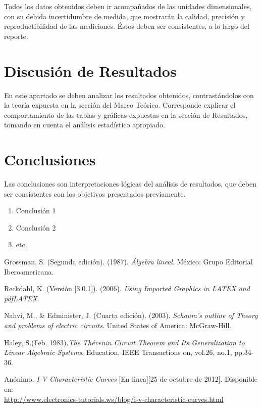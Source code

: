 \documentclass[osajnl,twocolumn,showpacs,superscriptaddress,10pt]{revtex4-1}
\begin{document}
    Todos los datos obtenidos deben ir acompañados de las unidades dimensionales, con su debida incertidumbre de medida, que mostrarán la calidad, precisión y reproductibilidad de las mediciones. Éstos deben ser consistentes, a lo largo del reporte.\\


\section{Discusión de Resultados}

    En este apartado se deben analizar los resultados obtenidos, contrastándolos con la teoría expuesta en la sección del Marco Teórico. Corresponde explicar el comportamiento de las tablas y gráficas expuestas en la sección de Resultados, tomando en cuenta el análisis estadístico apropiado.\\

\section{Conclusiones}

    Las conclusiones son interpretaciones lógicas del análisis de resultados, que deben ser consistentes con los objetivos presentados previamente.\\

\begin{enumerate}
    \item Conclusión 1
    \item Conclusión 2
    \item etc.
\end{enumerate}


\begin{thebibliography}{99}

\bibitem{} Grossman, S. (Segunda edición). (1987). \textit{Álgebra lineal}. México: Grupo Editorial Iberoamericana.

\bibitem{} Reckdahl, K. (Versión [3.0.1]). (2006).\textit{ Using Imported Graphics in LATEX and pdfLATEX}.

\bibitem{}Nahvi, M., \& Edminister, J. (Cuarta edición). (2003). \textit{Schaum's outline of Theory and problems of electric circuits}. United States of America: McGraw-Hill.

\bibitem{} Haley, S.(Feb. 1983).\textit{The Thévenin Circuit Theorem and Its Generalization to Linear Algebraic Systems}. Education, IEEE Transactions on, vol.26, no.1, pp.34-36.

\bibitem{}Anónimo.\textit{ I-V Characteristic Curves} [En linea][25 de octubre de 2012]. Disponible en:\\ \url{http://www.electronics-tutorials.ws/blog/i-v-characteristic-curves.html}
\end{thebibliography}
\end{document}
